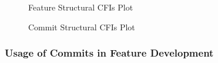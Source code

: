 \clearpage

\begin{figure}[htbp]
  \centering
  
  \caption{Feature Structural CFIs Plot}
  \label{fig:feature_sfbr_plot}
\end{figure}

\clearpage

\begin{figure}[htbp]
  \centering
  
  \caption{Commit Structural CFIs Plot}
  \label{fig:commit_sfbr_plot}
\end{figure}

\subsubsection*{Usage of Commits in Feature Development}\label{sec:eval_commit_usage}

